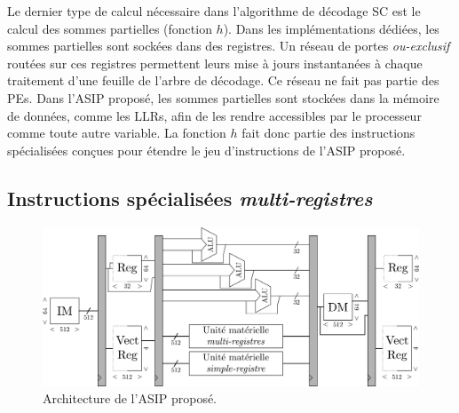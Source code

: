 Le dernier type de calcul nécessaire dans l'algorithme de décodage SC est le calcul des sommes partielles (fonction $h$). Dans les implémentations dédiées, les sommes partielles sont sockées dans des registres. Un réseau de portes \textit{ou-exclusif} routées sur ces registres permettent leurs mise à jours instantanées à chaque traitement d'une feuille de l'arbre de décodage. Ce réseau ne fait pas partie des PEs. Dans l'ASIP proposé, les sommes partielles sont stockées dans la mémoire de données, comme les LLRs, afin de les rendre accessibles par le processeur comme toute autre variable. La fonction $h$ fait donc partie des instructions spécialisées conçues pour étendre le jeu d'instructions de l'ASIP proposé.






\subsection{Instructions spécialisées \textit{multi-registres}}
\label{subsec:multi_reg}

\begin{figure}
\centering
\includegraphics[width=\textwidth]{main/ch3_fig/full_tensilica}
\caption{Architecture de l'ASIP proposé.}
\label{fig:full_tensilica}
\end{figure}

